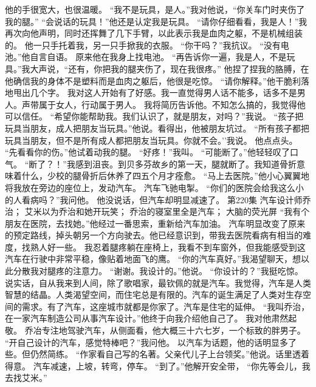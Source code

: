 \documentclass[a4paper,12pt,UTF8,twoside]{ctexbook}
\begin{document}
        他的手很宽大，也很温暖。 
        “我不是玩具，是人。”我对他说，“你关车门时夹伤了我的腿。” 
        “会说话的玩具！”他还是认定我是玩具。 
        “请你仔细看看，我是人！”我再次向他声明，同时还挥舞了几下手臂，以此表示我是血肉之躯，不是机械组装的。 
        他一只手托着我，另一只手掀我的衣服。 
        “你干吗？”我抗议。 
        “没有电池。”他自言自语。 
        原来他在我身上找电池。 
        “再告诉你一遍，我是人，不是玩具。”我大声说，“还有，你把我的腿夹伤了，现在我很疼。” 
        他捏了捏我的胳膊，在他确信我的身体不是塑料而是血肉之躯后，他很是吃惊。 
        “请你解释。”他干脆利落地甩出几个字。 
        我对这人开始有了好感。我一直觉得男人话不能多，话多不是男人。声带属于女人，行动属于男人。 
        我将简历告诉他。不知怎么搞的，我觉得他可以信任。 
        “希望你能帮助我。我们认识了，就是朋友，对吗？”我说。 
        “孩子把玩具当朋友，成人把朋友当玩具。”他说。看得出，他被朋友坑过。 
        “所有孩子都把玩具当朋友，但不是所有成人都把朋友当玩具。你就不会。’’我说。 
        他点点头。 
        “先看看你的伤。”他试着动我的腿。 
        “好疼！”我叫。 
        “可能断了。”他轻轻叹了口气。 
        “断了？！”我感到沮丧。到贝多芬故乡的第一天，腿就断了。我知道骨折意味着什么，少校的腿骨折后休养了四五个月才痊愈。 
        “马上去医院。”他小心翼翼地将我放在旁边的座位上，发动汽车。 
        汽车飞驰电掣。 
        “你们的医院会给我这么小的人看病吗？”我问他。 
        他没说话，但汽车却明显减速了。   第220集 
        汽车设计师乔治； 
        艾米以为乔治和她开玩笑； 
        乔治的寝室里全是汽车； 
        大脑的荧光屏   
        “我有个朋友在医院，去找她。”他经过一番思索，重新给汽车加油。 
        汽车明显改变了原来的预定路线，掉头朝另一个方向驶去。他已经意识到，带我去医院看病有相当的难度，找熟人好一些。 
        我忍着腿疼躺在座椅上，我看不到车窗外，但我能感受到这汽车在行驶中非常平稳，像贴着地面飞的鹰。 
        “你的汽车真好。”我渴望聊天，想以此分散我对腿疼的注意力。 
        “谢谢。我设计的。”他说。 
        “你设计的？”我挺吃惊。说实话，自从我来到人间，除了歌唱家，最钦佩的就是汽车。我觉得，汽车是人类智慧的结晶。人类渴望空间，而住宅总是有限的。汽车的诞生满足了人类对生存空间的需求。有了汽车，这座城市就都是你家了。汽车是住宅的延伸。 
        “我叫乔治，在一家汽车制造公司从事汽车设计。”他终于向我介绍他自己了。 
        我对他肃然起敬。 
        乔冶专注地驾驶汽车，从侧面看，他大概三十六七岁，一个标致的胖男子。 
        “开自己设计的汽车，感觉特棒吧？”我问他。 
        以汽车为话题，他的话明显多了些。但仍然简练。 
        “作家看自己写的名著。父亲代儿子上台领奖。”他说。话里透着得意。 
        汽车减速，上坡，转弯，停车。 
        “到了。”他解开安全带，  “你先等会儿，我去找艾米。” 
\end{document}
